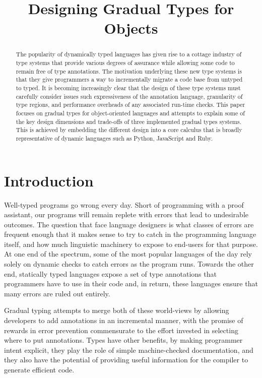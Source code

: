\documentclass[preprint]{sigplanconf}
\begin{document}
\title{Designing Gradual Types for Objects
\vspace{-1cm}} 
\authorinfo{}{}{} %
\maketitle

\begin{abstract}
The popularity of dynamically typed languages has given rise to a cottage
industry of type systems that provide various degrees of assurance
while allowing some code to remain free of type annotations. 
The motivation underlying these new type systems is that they give
programmers a way to incrementally migrate a code base from untyped
to typed.  It is becoming increasingly clear that the design of these
type systems must carefully consider issues such expressiveness of the 
annotation language, granularity of type regions, and performance overheads
of any associated run-time checks.  This paper focuses on gradual types for 
object-oriented languages and attempts to explain some of the key design 
dimensions and trade-offs of three implemented gradual types systems.
This is achieved by embedding the different design into a core calculus
that is broadly representative of dynamic languages such as Python, JavaScript
and Ruby.
\end{abstract} 

\section{Introduction}
Well-typed programs go wrong every day. Short of programming with a proof
assistant, our programs will remain replete with errors that lead to
undesirable outcomes.  The question that face language designers is what
classes of errors are frequent enough that it makes sense to try to catch in
the programming language itself, and how much linguistic machinery to expose
to end-users for that purpose.  At one end of the spectrum, some of the most
popular languages of the day rely solely on dynamic checks to catch errors
as the program runs. Towards the other end, statically typed languages
expose a set of type annotations that programmers have to use in their code
and, in return, these languages ensure that many errors are ruled out entirely.

Gradual typing attempts to merge both of these world-views by allowing
developers to add annotations in an incremental manner, with the promise of
rewards in error prevention commensurate to the effort invested in selecting
where to put annotations. Types have other benefits, by making programmer
intent explicit, they play the role of simple machine-checked documentation,
and they also have the potential of providing useful information for
the compiler to generate efficient code.
\end{document}
